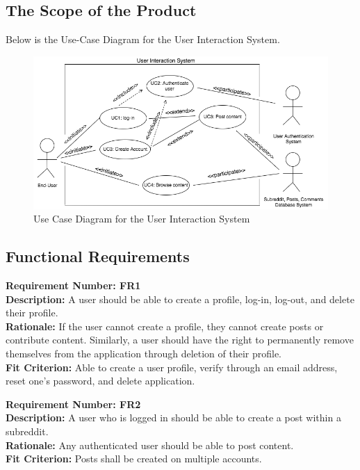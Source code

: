\documentclass[12pt,fleqn]{article}
\begin{document}
\subsection {The Scope of the Product}
Below is the Use-Case Diagram for the User Interaction System.
\begin{figure}[H]
\centering
\includegraphics[width=16cm]{UseCase}
\caption{Use Case Diagram for the User Interaction System}
\label{fig:use-case}
\end{figure}

\subsection {Functional Requirements}

\begin{tcolorbox}
\textbf{Requirement Number: FR1}\\
\textbf{Description:} A user should be able to create a profile, log-in, log-out, and delete their profile.\\
\textbf{Rationale:} If the user cannot create a profile, they cannot create posts or contribute content.  Similarly, a user should have the right to permanently remove themselves from the application through deletion of their profile. \\
\textbf{Fit Criterion:} Able to create a user profile, verify through an email address, reset one's password, and delete application.
\end{tcolorbox}

\begin{tcolorbox}
\textbf{Requirement Number: FR2} \\
\textbf{Description:} A user who is logged in should be able to create a post within a subreddit. \\
\textbf{Rationale:} Any authenticated user should be able to post content. \\
\textbf{Fit Criterion:} Posts shall be created on multiple accounts.
\end{tcolorbox}
\end{document}
